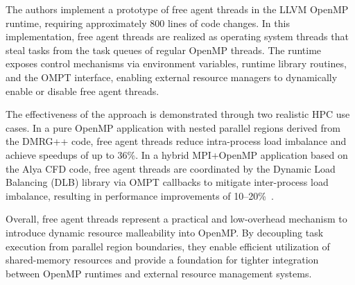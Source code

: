 The authors implement a prototype of free agent threads in the LLVM OpenMP runtime, requiring approximately 800 lines of code changes. In this implementation, free agent threads are realized as operating system threads that steal tasks from the task queues of regular OpenMP threads. The runtime exposes control mechanisms via environment variables, runtime library routines, and the OMPT interface, enabling external resource managers to dynamically enable or disable free agent threads.

The effectiveness of the approach is demonstrated through two realistic HPC use cases. In a pure OpenMP application with nested parallel regions derived from the DMRG++ code, free agent threads reduce intra-process load imbalance and achieve speedups of up to 36\%. In a hybrid MPI+OpenMP application based on the Alya CFD code, free agent threads are coordinated by the Dynamic Load Balancing (DLB) library via OMPT callbacks to mitigate inter-process load imbalance, resulting in performance improvements of 10--20\%~\parencite{mcintosh-smith_openmp_2021}.

Overall, free agent threads represent a practical and low-overhead mechanism to introduce dynamic resource malleability into OpenMP. By decoupling task execution from parallel region boundaries, they enable efficient utilization of shared-memory resources and provide a foundation for tighter integration between OpenMP runtimes and external resource management systems.
